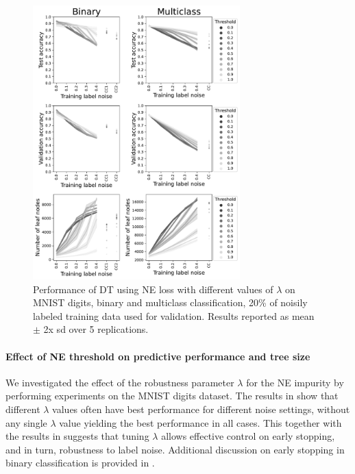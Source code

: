 \documentclass[letterpaper]{article} %
\begin{document}
\begin{figure}[t]
    \centering
    \includegraphics[width=8cm]{figs/threshold_tuning.pdf}
    \caption{Performance of DT using NE loss with different values of $\lambda$ on MNIST digits, binary and multiclass classification, 20\% of noisily labeled training data used for validation.
    Results reported as mean $\pm$ 2x sd over 5 replications.}
    \label{fig:threshold_tuning}
\end{figure}

\paragraph{Effect of NE threshold on predictive performance and tree size}
We investigated the effect of the robustness parameter $\lambda$ for the NE
impurity by performing experiments on
the MNIST digits dataset.
The results in  show that different $\lambda$ values
often have best performance for different noise settings, without any single
$\lambda$ value yielding the best performance in all cases.
This together with the results in  suggests that
tuning $\lambda$ allows effective control on early stopping,
and in turn,
robustness to label noise.
Additional discussion on early stopping in binary classification is provided in .
\end{document}
